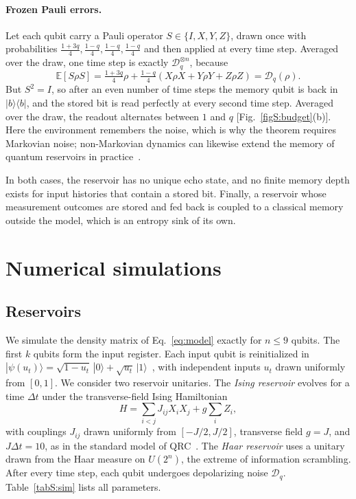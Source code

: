 \documentclass[aps,prl,twocolumn,superscriptaddress,floatfix]{revtex4-2}
\theoremstyle{plain}
\newcommand{\ket}[1]{|#1\rangle}
\newcommand{\ketbra}[2]{|#1\rangle\!\langle #2|}
\newcommand{\cD}{\mathcal D}
\begin{document}
\paragraph*{Frozen Pauli errors.} Let each qubit carry a Pauli operator $S\in\{I,X,Y,Z\}$, drawn once with probabilities $\frac{1+3q}4,\frac{1-q}4,\frac{1-q}4,\frac{1-q}4$ and then applied at every time step. Averaged over the draw, one time step is exactly $\cD_q^{\otimes n}$, because
\begin{equation}
\mathbb E[S\rho S]=\tfrac{1+3q}4\rho+\tfrac{1-q}4(X\rho X+Y\rho Y+Z\rho Z)=\cD_q(\rho).
\end{equation}
But $S^2=I$, so after an even number of time steps the memory qubit is back in $\ketbra bb$, and the stored bit is read perfectly at every second time step. Averaged over the draw, the readout alternates between $1$ and $q$ [Fig.~\ref{figS:budget}(b)]. Here the environment remembers the noise, which is why the theorem requires Markovian noise; non-Markovian dynamics can likewise extend the memory of quantum reservoirs in practice~\cite{Sannia2026}.

In both cases, the reservoir has no unique echo state, and no finite memory depth exists for input histories that contain a stored bit. Finally, a reservoir whose measurement outcomes are stored and fed back is coupled to a classical memory outside the model, which is an entropy sink of its own.

\section{Numerical simulations}
\label{sm:numerics}

\subsection{Reservoirs}

We simulate the density matrix of Eq.~\eqref{eq:model} exactly for $n\le9$ qubits. The first $k$ qubits form the input register. Each input qubit is reinitialized in $\ket{\psi(u_t)}=\sqrt{1-u_t}\,\ket0+\sqrt{u_t}\,\ket1$~\cite{Fujii2017}, with independent inputs $u_t$ drawn uniformly from $[0,1]$. We consider two reservoir unitaries. The \emph{Ising reservoir} evolves for a time $\Delta t$ under the transverse-field Ising Hamiltonian
\begin{equation}
H=\sum_{i<j}J_{ij}X_iX_j+g\sum_iZ_i,
\end{equation}
with couplings $J_{ij}$ drawn uniformly from $[-J/2,J/2]$, transverse field $g=J$, and $J\Delta t=10$, as in the standard model of QRC~\cite{Fujii2017,Nakajima2019,MartinezPena2021}. The \emph{Haar reservoir} uses a unitary drawn from the Haar measure on $U(2^n)$, the extreme of information scrambling. After every time step, each qubit undergoes depolarizing noise $\cD_q$. Table~\ref{tabS:sim} lists all parameters.
\end{document}
